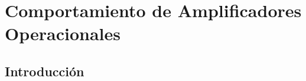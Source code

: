 \documentclass[../../main.tex]{subfiles}
\begin{document}
\section{Comportamiento de Amplificadores Operacionales}
\subsection{Introducci\'on}
\end{document}
